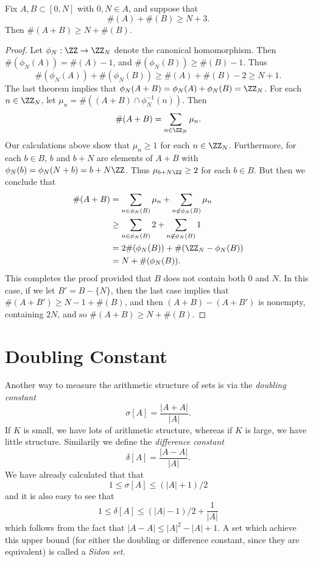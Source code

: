\begin{theorem}
    Fix $A,B \subset [0,N]$ with $0,N \in A$, and suppose that
    \[ \#(A) + \#(B) \geq N + 3. \]
    Then $\#(A + B) \geq N + \#(B)$.
\end{theorem}
\begin{proof}
    Let $\phi_N: \ZZ \to \ZZ_N$ denote the canonical homomorphism. Then $\#(\phi_N(A)) = \#(A) - 1$, and $\#(\phi_N(B)) \geq \#(B) - 1$. Thus
    \[ \#(\phi_N(A)) + \#(\phi_N(B)) \geq \#(A) + \#(B) - 2 \geq N + 1. \]
    The last theorem implies that $\phi_N(A + B) = \phi_N(A) + \phi_N(B) = \ZZ_N$. For each $n \in \ZZ_N$, let $\mu_n = \#((A + B) \cap \phi_N^{-1}(n))$. Then
    \[ \#(A + B) = \sum_{n \in \ZZ_N} \mu_n. \]
    Our calculations above show that $\mu_n \geq 1$ for each $n \in \ZZ_N$. Furthermore, for each $b \in B$, $b$ and $b+N$ are elements of $A + B$ with $\phi_N(b) = \phi_N(N + b) = b + N \ZZ$. Thus $\mu_{b + N \ZZ} \geq 2$ for each $b \in B$. But then we conclude that
    \begin{align*}
        \#(A + B) &= \sum_{n \in \phi_N(B)} \mu_n + \sum_{n \not \in \phi_N(B)} \mu_n\\
        &\geq \sum_{n \in \phi_N(B)} 2 + \sum_{n \not \in \phi_N(B)} 1\\
        &= 2 \#(\phi_N(B)) + \#(\ZZ_N - \phi_N(B))\\
        &= N + \#(\phi_N(B)).
    \end{align*}
    This completes the proof provided that $B$ does not contain both $0$ and $N$. In this case, if we let $B' = B - \{ N \}$, then the last case implies that $\#(A + B') \geq N-1 + \#(B)$, and then $(A + B) - (A + B')$ is nonempty, containing $2N$, and so $\#(A + B) \geq N + \#(B)$.
\end{proof}


\section{Doubling Constant}

Another way to measure the arithmetic structure of sets is via the \emph{doubling constant}
%
\[ \sigma[A] = \frac{|A + A|}{|A|}. \]
%
If $K$ is small, we have lots of arithmetic structure, whereas if $K$ is large, we have little structure. Similarily we define the \emph{difference constant}
%
\[ \delta[A] = \frac{|A - A|}{|A|}. \]
%
We have already calculated that that
%
\[ 1 \leq \sigma[A] \leq (|A| + 1)/2 \]
%
and it is also easy to see that
%
\[ 1 \leq \delta[A] \leq (|A| - 1)/2 + \frac{1}{|A|} \]
%
which follows from the fact that $|A - A| \leq |A|^2 - |A| + 1$. A set which achieve this upper bound (for either the doubling or difference constant, since they are equivalent) is called a \emph{Sidon set}.

